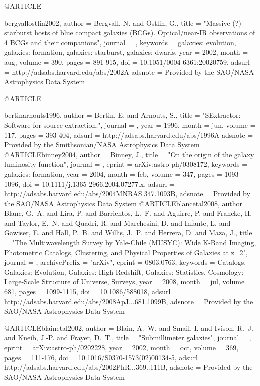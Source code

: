 {{{{@ARTICLE{bergvallostlin2002,
   author = {{Bergvall}, N. and {{\"O}stlin}, G.},
    title = "{Massive (?) starburst hosts of blue compact galaxies (BCGs). Optical/near-IR observations of 4 BCGs and their companions}",
  journal = {\aap},
 keywords = {galaxies: evolution, galaxies: formation, galaxies: starburst, galaxies: dwarfs},
     year = 2002,
    month = aug,
   volume = 390,
    pages = {891-915},
      doi = {10.1051/0004-6361:20020759},
   adsurl = {http://adsabs.harvard.edu/abs/2002A%
  adsnote = {Provided by the SAO/NASA Astrophysics Data System}
}

@ARTICLE{bertinarnouts1996,
   author = {{Bertin}, E. and {Arnouts}, S.},
    title = "{SExtractor: Software for source extraction.}",
  journal = {\aaps},
     year = 1996,
    month = jun,
   volume = 117,
    pages = {393-404},
   adsurl = {http://adsabs.harvard.edu/abs/1996A%
  adsnote = {Provided by the Smithsonian/NASA Astrophysics Data System}
}
@ARTICLE{binney2004,
   author = {{Binney}, J.},
    title = "{On the origin of the galaxy luminosity function}",
  journal = {\mnras},
   eprint = {arXiv:astro-ph/0308172},
 keywords = {galaxies: formation},
     year = 2004,
    month = feb,
   volume = 347,
    pages = {1093-1096},
      doi = {10.1111/j.1365-2966.2004.07277.x},
   adsurl = {http://adsabs.harvard.edu/abs/2004MNRAS.347.1093B},
  adsnote = {Provided by the SAO/NASA Astrophysics Data System}
}
@ARTICLE{blancetal2008,
   author = {{Blanc}, G.~A. and {Lira}, P. and {Barrientos}, L.~F. and {Aguirre}, P. and 
	{Francke}, H. and {Taylor}, E.~N. and {Quadri}, R. and {Marchesini}, D. and 
	{Infante}, L. and {Gawiser}, E. and {Hall}, P.~B. and {Willis}, J.~P. and 
	{Herrera}, D. and {Maza}, J.},
    title = "{The Multiwavelength Survey by Yale-Chile (MUSYC): Wide K-Band Imaging, Photometric Catalogs, Clustering, and Physical Properties of Galaxies at z=2}",
  journal = {\apj},
archivePrefix = "arXiv",
   eprint = {0803.0763},
 keywords = {Catalogs, Galaxies: Evolution, Galaxies: High-Redshift, Galaxies: Statistics, Cosmology: Large-Scale Structure of Universe, Surveys},
     year = 2008,
    month = jul,
   volume = 681,
    pages = {1099-1115},
      doi = {10.1086/588018},
   adsurl = {http://adsabs.harvard.edu/abs/2008ApJ...681.1099B},
  adsnote = {Provided by the SAO/NASA Astrophysics Data System}
}


@ARTICLE{blainetal2002,
   author = {{Blain}, A.~W. and {Smail}, I. and {Ivison}, R.~J. and {Kneib}, {J.-P.} and 
	{Frayer}, D.~T.},
    title = "{Submillimeter galaxies}",
  journal = {\physrep},
   eprint = {arXiv:astro-ph/0202228},
     year = 2002,
    month = oct,
   volume = 369,
    pages = {111-176},
      doi = {10.1016/S0370-1573(02)00134-5},
   adsurl = {http://adsabs.harvard.edu/abs/2002PhR...369..111B},
  adsnote = {Provided by the SAO/NASA Astrophysics Data System}
}


}}}}}}
